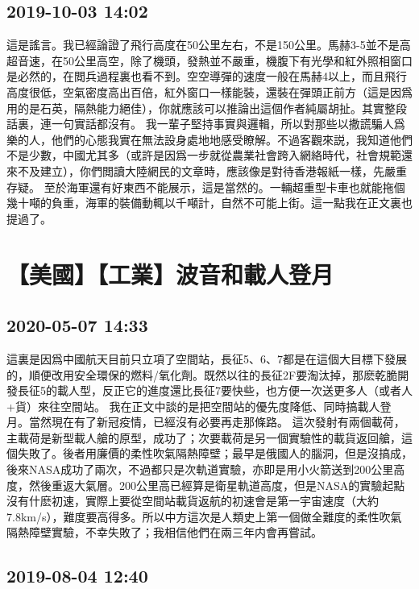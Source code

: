 \documentclass[twocolumn]{ctexart}
\begin{document}
\subsection*{2019-10-03 14:02}

這是謠言。我已經論證了飛行高度在50公里左右，不是150公里。馬赫3-5並不是高超音速，在50公里高空，除了機頭，發熱並不嚴重，機腹下有光學和紅外照相窗口是必然的，在閲兵過程裏也看不到。空空導彈的速度一般在馬赫4以上，而且飛行高度很低，空氣密度高出百倍，紅外窗口一樣能裝，還裝在彈頭正前方（這是因爲用的是石英，隔熱能力絕佳），你就應該可以推論出這個作者純屬胡扯。其實整段話裏，連一句實話都沒有。
我一輩子堅持事實與邏輯，所以對那些以撒謊騙人爲樂的人，他們的心態我實在無法設身處地地感受瞭解。不過客觀來説，我知道他們不是少數，中國尤其多（或許是因爲一步就從農業社會跨入網絡時代，社會規範還來不及建立），你們閲讀大陸網民的文章時，應該像是對待香港報紙一樣，先嚴重存疑。
至於海軍還有好東西不能展示，這是當然的。一輛超重型卡車也就能拖個幾十噸的負重，海軍的裝備動輒以千噸計，自然不可能上街。這一點我在正文裏也提過了。
\section*{【美國】【工業】波音和載人登月}
\subsection*{2020-05-07 14:33}

這裏是因爲中國航天目前只立項了空間站，長征5、6、7都是在這個大目標下發展的，順便改用安全環保的燃料/氧化劑。既然以往的長征2F要淘汰掉，那麽乾脆開發長征5的載人型，反正它的進度還比長征7要快些，也方便一次送更多人（或者人+貨）來往空間站。
我在正文中談的是把空間站的優先度降低、同時搞載人登月。當然現在有了新冠疫情，已經沒有必要再走那條路。
這次發射有兩個載荷，主載荷是新型載人艙的原型，成功了；次要載荷是另一個實驗性的載貨返回艙，這個失敗了。後者用廉價的柔性吹氣隔熱障壁；最早是俄國人的腦洞，但是沒搞成，後來NASA成功了兩次，不過都只是次軌道實驗，亦即是用小火箭送到200公里高度，然後重返大氣層。200公里高已經算是衛星軌道高度，但是NASA的實驗起點沒有什麽初速，實際上要從空間站載貨返航的初速會是第一宇宙速度（大約7.8km/s），難度要高得多。所以中方這次是人類史上第一個做全難度的柔性吹氣隔熱障壁實驗，不幸失敗了；我相信他們在兩三年内會再嘗試。
\subsection*{2019-08-04 12:40}
\end{document}
